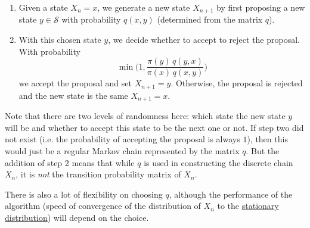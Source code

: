     \begin{enumerate}
      \item Given a state $X_n = x$, we generate a new state $X_{n+1}$ by first proposing a new state $y \in \mathcal{S}$ with probability $q(x, y)$ (determined from the matrix $q$). 
      \item With this chosen state $y$, we decide whether to accept to reject the proposal. With probability 
      \begin{equation}
        \min \bigg( 1, \frac{\pi(y) \,  q(y, x)}{\pi(x) \, q(x, y)} \bigg)
      \end{equation}
      we accept the proposal and set $X_{n+1} = y$. Otherwise, the proposal is rejected and the new state is the same $X_{n+1} = x$. 
    \end{enumerate}

    Note that there are two levels of randomness here: which state the new state $y$ will be and whether to accept this state to be the next one or not. If step two did not exist (i.e. the probability of accepting the proposal is always $1$), then this would just be a regular Markov chain represented by the matrix $q$. But the addition of step 2 means that while $q$ is used in constructing the discrete chain $X_n$, it is \textit{not} the transition probability matrix of $X_n$. 

    There is also a lot of flexibility on choosing $q$, although the performance of the algorithm (speed of convergence of the distribution of $X_n$ to the \hyperref[def:stationary-distribution]{stationary distribution}) will depend on the choice.

